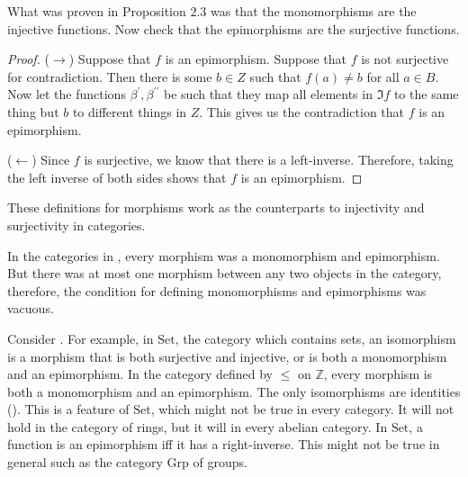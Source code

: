 \documentclass{report}
\begin{document}
\begin{examples}
    \begin{example}[\label{exm:1.4.9}]
        What was proven in Proposition $2.3$ was that the monomorphisms are the injective functions. Now check that the epimorphisms are the surjective functions.
            \begin{proof}
                ($\rightarrow $) Suppose that $f$ is an epimorphism. Suppose that $f$ is not surjective for contradiction. Then there is some $b \in Z$ such that $f(a) \neq b$ for all $a \in B$. Now let the functions $\beta^{\prime}, \beta^{\prime\prime}$ be such that they map all elements in $\Im{f}$ to the same thing but $b$ to different things in $Z$. This gives us the contradiction that $f$ is an epimorphism.

                ($\leftarrow $) Since $f$ is surjective, we know that there is a left-inverse. Therefore, taking the left inverse of both sides shows that $f$ is an epimorphism.
            \end{proof}
        These definitions for morphisms work as the counterparts to injectivity and surjectivity in categories.
    \end{example}

    \begin{example}[\label{exm:1.4.10}]
        In the categories in , every morphism was a monomorphism and epimorphism. But there was at most one morphism between any two objects in the category, therefore, the condition for defining monomorphisms and epimorphisms was vacuous.
    \end{example}
\end{examples}

Consider . For example, in $\text{Set}$, the category which contains sets, an isomorphism is a morphism that is both surjective and injective, or is both a monomorphism and an epimorphism. In the category defined by $\leq $ on $\mathbb{Z}$, every morphism is both a monomorphism and an epimorphism. The only isomorphisms are identities (). This is a feature of $\text{Set}$, which might not be true in every category. It will not hold in the category of rings, but it will in every abelian category. In $\text{Set}$, a function is an epimorphism iff it has a right-inverse. This might not be true in general such as the category $\text{Grp}$ of groups.
\end{document}
